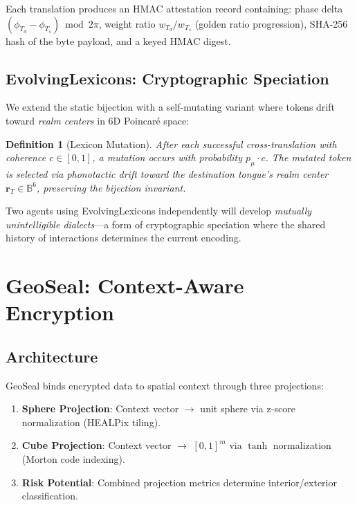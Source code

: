 \documentclass[11pt,a4paper]{article}
\newtheorem{definition}[theorem]{Definition}
\newcommand{\BB}{\mathbb{B}}
\begin{document}
Each translation produces an HMAC attestation record containing:
phase delta $(\phi_{T_d} - \phi_{T_s}) \bmod 2\pi$,
weight ratio $w_{T_d}/w_{T_s}$ (golden ratio progression),
SHA-256 hash of the byte payload, and a keyed HMAC digest.

\subsection{EvolvingLexicons: Cryptographic Speciation}

We extend the static bijection with a self-mutating variant where
tokens drift toward \emph{realm centers} in 6D Poincar\'{e} space:

\begin{definition}[Lexicon Mutation]
After each successful cross-translation with coherence $c \in [0, 1]$,
a mutation occurs with probability $p_\mu \cdot c$. The mutated token
is selected via phonotactic drift toward the destination tongue's
realm center $\mathbf{r}_T \in \BB^6$, preserving the bijection
invariant.
\end{definition}

Two agents using EvolvingLexicons independently will develop
\emph{mutually unintelligible dialects}---a form of cryptographic
speciation where the shared history of interactions determines the
current encoding.

\section{GeoSeal: Context-Aware Encryption}
\label{sec:geoseal}

\subsection{Architecture}

GeoSeal binds encrypted data to spatial context through three projections:

\begin{enumerate}
  \item \textbf{Sphere Projection}: Context vector $\to$ unit sphere
        via z-score normalization (HEALPix tiling).
  \item \textbf{Cube Projection}: Context vector $\to$ $[0,1]^m$ via
        $\tanh$ normalization (Morton code indexing).
  \item \textbf{Risk Potential}: Combined projection metrics determine
        interior/exterior classification.
\end{enumerate}
\end{document}
